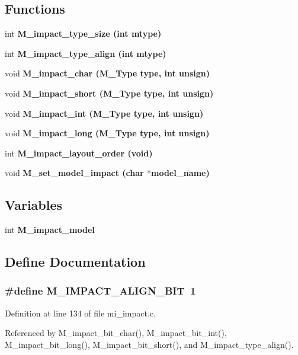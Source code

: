 \subsection*{Functions}
\begin{CompactItemize}
\item 
int \bf{M\_\-impact\_\-type\_\-size} (int mtype)
\item 
int \bf{M\_\-impact\_\-type\_\-align} (int mtype)
\item 
void \bf{M\_\-impact\_\-char} (\bf{M\_\-Type} type, int unsign)
\item 
void \bf{M\_\-impact\_\-short} (\bf{M\_\-Type} type, int unsign)
\item 
void \bf{M\_\-impact\_\-int} (\bf{M\_\-Type} type, int unsign)
\item 
void \bf{M\_\-impact\_\-long} (\bf{M\_\-Type} type, int unsign)
\item 
int \bf{M\_\-impact\_\-layout\_\-order} (void)
\item 
void \bf{M\_\-set\_\-model\_\-impact} (char $\ast$model\_\-name)
\end{CompactItemize}
\subsection*{Variables}
\begin{CompactItemize}
\item 
int \bf{M\_\-impact\_\-model}
\end{CompactItemize}


\subsection{Define Documentation}
\subsubsection{\setlength{\rightskip}{0pt plus 5cm}\#define M\_\-IMPACT\_\-ALIGN\_\-BIT~1}\label{mi__impact_8c_4f2a3874aa6954ada8e045dc3a958fef}




Definition at line 134 of file mi\_\-impact.c.

Referenced by M\_\-impact\_\-bit\_\-char(), M\_\-impact\_\-bit\_\-int(), M\_\-impact\_\-bit\_\-long(), M\_\-impact\_\-bit\_\-short(), and M\_\-impact\_\-type\_\-align().
